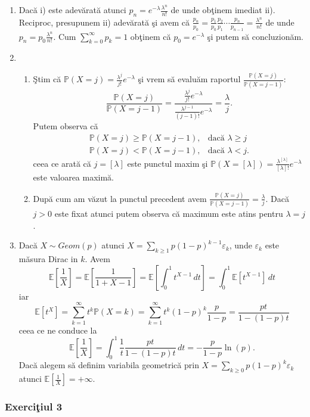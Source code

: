 \documentclass[]{article}
\def\l{{\lambda}}
\def\e{{\varepsilon}}
\def\PP{{\mathbb P}}
\def\EE{{\mathbb E}}
\begin{document}
\begin{enumerate}
\def\labelenumi{\alph{enumi})}
\item
  Dac\u a i) este adev\u arat\u a atunci \(p_n=e^{-\l}\frac{\l^n}{n!}\)
  de unde ob\c tinem imediat ii). Reciproc, presupunem ii)
  adev\u arat\u a \c si avem c\u a
  \(\frac{p_n}{p_0}=\frac{p_1}{p_0}\frac{p_2}{p_1}\cdots\frac{p_n}{p_{n-1}}=\frac{\l^n}{n!}\)
  de unde \(p_n=p_0\frac{\l^n}{n!}\). Cum \(\sum_{k=0}^{\infty}p_k=1\)
  ob\c tinem c\u a \(p_0=e^{-\l}\) \c si putem s\u a concluzion\u am.
\item
  \begin{enumerate}
  \def\labelenumii{\roman{enumii})}
  \item
    \c Stim c\u a \(\PP(X=j)=\frac{\l^j}{j!}e^{-\l}\) \c si vrem s\u a
    evalu\u am raportul \(\frac{\PP(X=j)}{\PP(X=j-1)}\): \[
    \frac{\PP(X=j)}{\PP(X=j-1)}=\frac{\frac{\l^j}{j!}e^{-\l}}{\frac{\l^{j-1}}{(j-1)!}e^{-\l}}=\frac{\l}{j}.
    \] Putem observa c\u a \[
    \begin{array}{ll}
     \PP(X=j)\geq\PP(X=j-1), & \mbox{dac\u a $\l\geq j$}\\
      \PP(X=j)<\PP(X=j-1), & \mbox{dac\u a $\l<j$}.\end{array}
      \] ceea ce arat\u a c\u a \(j=[\l]\) este punctul maxim \c si
    \(\PP(X=[\l])=\frac{\l^{[\l]}}{[\l]!}e^{-\l}\) este valoarea
    maxim\u a.
  \item
    Dup\u a cum am v\u azut la punctul precedent avem
    \(\frac{\PP(X=j)}{\PP(X=j-1)}=\frac{\l}{j}\). Dac\u a \(j>0\) este
    fixat atunci putem observa c\u a maximum este atins pentru \(\l=j\).
  \end{enumerate}
\item
  Dac\u a \(X\sim Geom(p)\) atunci
  \(X=\sum_{k\geq1}p(1-p)^{k-1}\e_{k}\), unde \(\e_k\) este m\u asura
  Dirac in \(k\). Avem \[
    \EE\left[\frac{1}{X}\right] = \EE\left[\frac{1}{1+X-1}\right] = \EE\left[\int_{0}^{1}t^{X-1}\,dt\right] = \int_{0}^{1}\EE[t^{X-1}]\,dt
  \] iar \[
    \EE[t^X] = \sum_{k=1}^{\infty}t^{k}\PP(X=k) = \sum_{k=1}^{\infty}t^{k}(1-p)^k\frac{p}{1-p}=\frac{pt}{1-(1-p)t}
  \] ceea ce ne conduce la \[
    \EE\left[\frac{1}{X}\right] = \int_{0}^{1}\frac{1}{t}\frac{pt}{1-(1-p)t}\, dt = -\frac{p}{1-p}\ln(p).
  \] Dac\u a alegem s\u a definim variabila geometric\u a prin
  \(X=\sum_{k\geq0}p(1-p)^{k}\e_{k}\) atunci
  \(\EE\left[\frac{1}{X}\right]=+\infty\).
\end{enumerate}

\subsubsection{\texorpdfstring{Exerci\c tiul
3}{Exerciiul 3}}\label{exerciiul-3}
\end{document}
